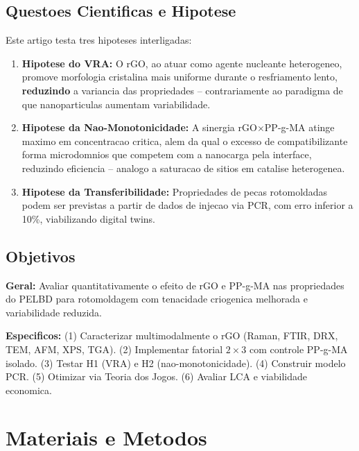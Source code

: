 \documentclass[11pt,a4paper,oneside]{article}
\begin{document}
\subsection{Questoes Cientificas e Hipotese}\label{sec:hipoteses}

Este artigo testa tres hipoteses interligadas:

\begin{enumerate}[label=\textbf{H\arabic*:},nosep,leftmargin=*]
    \item {\bfseries Hipotese do VRA:} O rGO, ao atuar como agente nucleante heterogeneo, promove morfologia cristalina mais uniforme durante o resfriamento lento, {\bfseries reduzindo} a variancia das propriedades -- contrariamente ao paradigma de que nanoparticulas aumentam variabilidade.
    \item {\bfseries Hipotese da Nao-Monotonicidade:} A sinergia rGO$\times$PP-g-MA atinge maximo em concentracao critica, alem da qual o excesso de compatibilizante forma microdomnios que competem com a nanocarga pela interface, reduzindo eficiencia -- analogo a saturacao de sitios em catalise heterogenea.
    \item {\bfseries Hipotese da Transferibilidade:} Propriedades de pecas rotomoldadas podem ser previstas a partir de dados de injecao via PCR, com erro inferior a 10\%, viabilizando digital twins.
\end{enumerate}

\subsection{Objetivos}

{\bfseries Geral:} Avaliar quantitativamente o efeito de rGO e PP-g-MA nas propriedades do PELBD para rotomoldagem com tenacidade criogenica melhorada e variabilidade reduzida.

{\bfseries Especificos:} (1) Caracterizar multimodalmente o rGO (Raman, FTIR, DRX, TEM, AFM, XPS, TGA). (2) Implementar fatorial $2{\times}3$ com controle PP-g-MA isolado. (3) Testar H1 (VRA) e H2 (nao-monotonicidade). (4) Construir modelo PCR. (5) Otimizar via Teoria dos Jogos. (6) Avaliar LCA e viabilidade economica.

\section{Materiais e Metodos}
\end{document}
